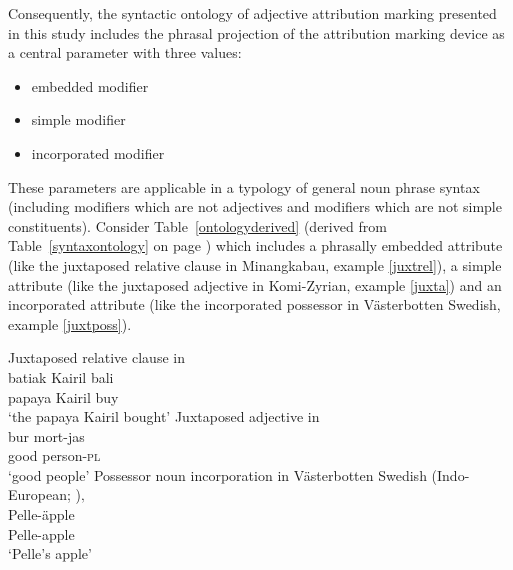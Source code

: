 Consequently, the syntactic ontology of adjective attribution marking presented in this study includes the phrasal projection of the attribution marking device as a central parameter with three values:
\begin{itemize}
\item embedded modifier
\item simple modifier
\item incorporated modifier
\end{itemize}
These parameters are applicable in a typology of general noun phrase syntax (including modifiers which are not adjectives and modifiers which are not simple constituents). Consider Table~\ref{ontologyderived} (derived from Table~\ref{syntaxontology} on page \pageref{syntaxontology}) which includes a phrasally embedded attribute (like the juxtaposed relative clause in Minangkabau, example \ref{juxtrel}), a simple attribute (like the juxtaposed adjective in Komi-Zyrian, example \ref{juxta}) and an incorporated attribute (like the incorporated possessor in Västerbotten Swedish, example \ref{juxtposs}).
\begin{exe}
\ex
\begin{xlist}
\ex \label{juxtrel}
\rm{Juxtaposed relative clause in }\\
\gll batiak Kairil bali\\
	papaya Kairil buy\\
\glt	‘the papaya Kairil bought’
\ex \label{juxta}
\rm{Juxtaposed adjective in }\\
\gll		bur	mort-jas\\
		good	person-\textsc{pl}\\
\glt		‘good people’
\ex \label{juxtposs}
\rm{Possessor noun incorporation in Västerbotten Swedish (Indo-European; \citealt[3–4]{gil2005})}‚\\
\gll	Pelle-äpple\\
	Pelle-apple\\
\glt	‘Pelle's apple’
\end{xlist}
\end{exe}
